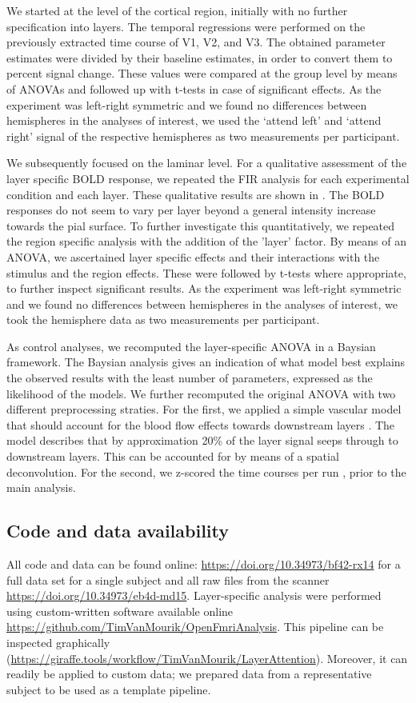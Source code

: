 \documentclass[9pt,lineno]{aperture}
\begin{document}
We started at the level of the cortical region, initially with no further specification into layers. The temporal regressions were performed on the previously extracted time course of V1, V2, and V3. The obtained parameter estimates were divided by their baseline estimates, in order to convert them to percent signal change. These values were compared at the group level by means of ANOVAs and followed up with t-tests in case of significant effects. As the experiment was left-right symmetric and we found no differences between hemispheres in the analyses of interest, we used the `attend left' and `attend right' signal of the respective hemispheres as two measurements per participant.

We subsequently focused on the laminar level. For a qualitative assessment of the layer specific BOLD response, we repeated the FIR analysis for each experimental condition and each layer. These qualitative results are shown in . The BOLD responses do not seem to vary per layer beyond a general intensity increase towards the pial surface. To further investigate this quantitatively, we repeated the region specific analysis with the addition of the 'layer’ factor. By means of an ANOVA, we ascertained layer specific effects and their interactions with the stimulus and the region effects. These were followed by t-tests where appropriate, to further inspect significant results. As the experiment was left-right symmetric and we found no differences between hemispheres in the analyses of interest, we took the hemisphere data as two measurements per participant.

As control analyses, we recomputed the layer-specific ANOVA in a Baysian framework. The Baysian analysis gives an indication of what model best explains the observed results with the least number of parameters, expressed as the likelihood of the models. We further recomputed the original ANOVA with two different preprocessing straties. For the first, we applied a simple vascular model that should account for the blood flow effects towards downstream layers \citet{Markuerkiaga2021}. The model describes that by approximation 20\% of the layer signal seeps through to downstream layers. This can be accounted for by means of a spatial deconvolution. For the second, we z-scored the time courses per run \citet{Lawrence2018}, prior to the main analysis.

\subsection{Code and data availability}
All code and data can be found online: \url{https://doi.org/10.34973/bf42-rx14} for a full data set for a single subject and all raw files from the scanner \url{https://doi.org/10.34973/eb4d-md15}. Layer-specific analysis were performed using custom-written software available online \url{https://github.com/TimVanMourik/OpenFmriAnalysis}. This pipeline can be inspected graphically \citep{VanMourik2018} (\url{https://giraffe.tools/workflow/TimVanMourik/LayerAttention}). Moreover, it can readily be applied to custom data; we prepared data from a representative subject to be used as a template pipeline. 
\end{document}
